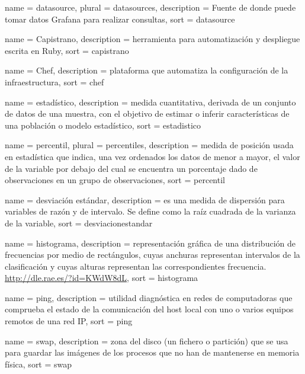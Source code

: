 \newpage

 {
  name        = {datasource},
  plural      = {datasources},
  description = {Fuente de donde puede tomar datos Grafana para realizar consultas},
  sort        = {datasource}
}

 {
  name        = {Capistrano},
  description = {herramienta para automatización y despliegue escrita en Ruby},
  sort        = {capistrano}
}

 {
  name        = {Chef},
  description =
    {plataforma que automatiza la configuración de la infraestructura},
  sort        = {chef}
}

 {
  name        = {estadístico},
  description =
    {medida cuantitativa, derivada de un conjunto de datos de una muestra, con
    el objetivo de estimar o inferir características de una población o modelo
    estadístico},
  sort        = {estadistico}
}

 {
  name        = {percentil},
  plural      = {percentiles},
  description =
    {medida de posición usada en estadística que indica, una vez ordenados los
    datos de menor a mayor, el valor de la variable por debajo del cual se
    encuentra un porcentaje dado de observaciones en un grupo de observaciones},
  sort        = {percentil}
}

 {
  name        = {desviación estándar},
  description =
    {es una medida de dispersión para variables de razón y de intervalo. Se
    define como la raíz cuadrada de la varianza de la variable},
  sort        = {desviacionestandar}
}

 {
  name        = {histograma},
  description =
    {representación gráfica de una distribución de frecuencias por medio de
    rectángulos, cuyas anchuras representan intervalos de la clasificación y
    cuyas alturas representan las correspondientes frecuencia.
    \url{http://dle.rae.es/?id=KWdW8dL}},
  sort        = {histograma}
}

 {
  name        = {ping},
  description =
    {utilidad diagnóstica en redes de computadoras que comprueba el estado de
    la comunicación del host local con uno o varios equipos remotos de una red
    IP},
  sort        = {ping}
}

 {
  name        = {swap},
  description =
    {zona del disco (un fichero o partición) que se usa para guardar las
    imágenes de los procesos que no han de mantenerse en memoria física},
  sort        = {swap}
}

